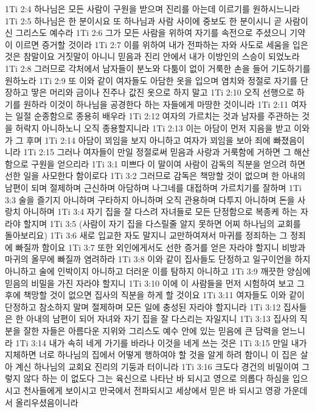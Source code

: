 1Ti 2:4  하나님은 모든 사람이 구원을 받으며 진리를 아는데 이르기를 원하시느니라
1Ti 2:5  하나님은 한 분이시요 또 하나님과 사람 사이에 중보도 한 분이시니 곧 사람이신 그리스도 예수라
1Ti 2:6  그가 모든 사람을 위하여 자기를 속전으로 주셨으니 기약이 이르면 증거할 것이라
1Ti 2:7  이를 위하여 내가 전파하는 자와 사도로 세움을 입은 것은 참말이요 거짓말이 아니니 믿음과 진리 안에서 내가 이방인의 스승이 되었노라
1Ti 2:8  그러므로 각처에서 남자들이 분노와 다툼이 없이 거룩한 손을 들어 기도하기를 원하노라
1Ti 2:9  또 이와 같이 여자들도 아담한 옷을 입으며 염치와 정절로 자기를 단장하고 땋은 머리와 금이나 진주나 값진 옷으로 하지 말고
1Ti 2:10  오직 선행으로 하기를 원하라 이것이 하나님을 공경한다 하는 자들에게 마땅한 것이니라
1Ti 2:11  여자는 일절 순종함으로 종용히 배우라
1Ti 2:12  여자의 가르치는 것과 남자를 주관하는 것을 허락지 아니하노니 오직 종용할지니라
1Ti 2:13  이는 아담이 먼저 지음을 받고 이와가 그 후며
1Ti 2:14  아담이 꾀임을 보지 아니하고 여자가 꾀임을 보아 죄에 빠졌음이니라
1Ti 2:15  그러나 여자들이 만일 정절로써 믿음과 사랑과 거룩함에 거하면 그 해산함으로 구원을 얻으리라
1Ti 3:1  미쁘다 이 말이여 사람이 감독의 직분을 얻으려 하면 선한 일을 사모한다 함이로다
1Ti 3:2  그러므로 감독은 책망할 것이 없으며 한 아내의 남편이 되며 절제하며 근신하며 아담하며 나그네를 대접하며 가르치기를 잘하며
1Ti 3:3  술을 즐기지 아니하며 구타하지 아니하며 오직 관용하며 다투지 아니하며 돈을 사랑치 아니하며
1Ti 3:4  자기 집을 잘 다스려 자녀들로 모든 단정함으로 복종케 하는 자라야 할지며
1Ti 3:5  (사람이 자기 집을 다스릴줄 알지 못하면 어찌 하나님의 교회를 돌아보리요)
1Ti 3:6  새로 입교한 자도 말지니 교만하여져서 마귀를 정죄하는 그 정죄에 빠질까 함이요
1Ti 3:7  또한 외인에게서도 선한 증거를 얻은 자라야 할지니 비방과 마귀의 올무에 빠질까 염려하라
1Ti 3:8  이와 같이 집사들도 단정하고 일구이언을 하지 아니하고 술에 인박이지 아니하고 더러운 이를 탐하지 아니하고
1Ti 3:9  깨끗한 양심에 믿음의 비밀을 가진 자라야 할지니
1Ti 3:10  이에 이 사람들을 먼저 시험하여 보고 그 후에 책망할 것이 없으면 집사의 직분을 하게 할 것이요
1Ti 3:11  여자들도 이와 같이 단정하고 참소하지 말며 절제하며 모든 일에 충성된 자라야 할지니라
1Ti 3:12  집사들은 한 아내의 남편이 되어 자녀와 자기 집을 잘 다스리는 자일지니
1Ti 3:13  집사의 직분을 잘한 자들은 아름다운 지위와 그리스도 예수 안에 있는 믿음에 큰 담력을 얻느니라
1Ti 3:14  내가 속히 네게 가기를 바라나 이것을 네게 쓰는 것은
1Ti 3:15  만일 내가 지체하면 너로 하나님의 집에서 어떻게 행하여야 할 것을 알게 하려 함이니 이 집은 살아 계신 하나님의 교회요 진리의 기둥과 터이니라
1Ti 3:16  크도다 경건의 비밀이여 그렇지 않다 하는 이 없도다 그는 육신으로 나타난 바 되시고 영으로 의롭다 하심을 입으시고 천사들에게 보이시고 만국에서 전파되시고 세상에서 믿은 바 되시고 영광 가운데서 올리우셨음이니라
